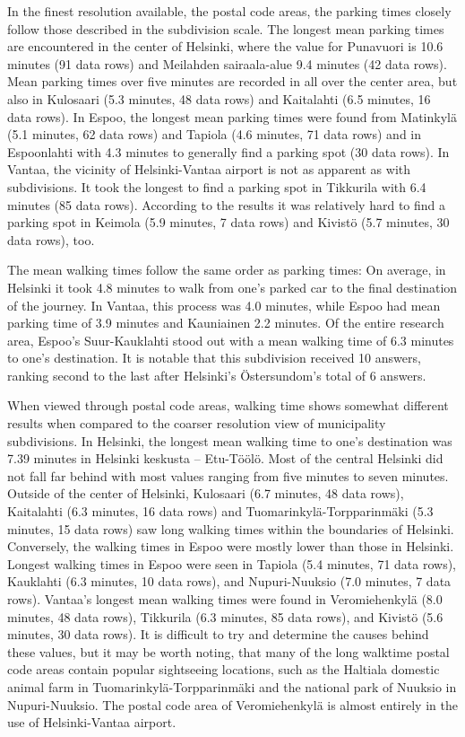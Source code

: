 In the finest resolution available, the postal code areas, the parking times closely follow those described in the subdivision scale. The longest mean parking times are encountered in the center of Helsinki, where the value for Punavuori is 10.6 minutes (91 data rows) and Meilahden sairaala-alue 9.4 minutes (42 data rows). Mean parking times over five minutes are recorded in all over the center area, but also in Kulosaari (5.3 minutes, 48 data rows) and Kaitalahti (6.5 minutes, 16 data rows). In Espoo, the longest mean parking times were found from Matinkylä (5.1 minutes, 62 data rows) and Tapiola (4.6 minutes, 71 data rows) and in Espoonlahti with 4.3 minutes to generally find a parking spot (30 data rows). In Vantaa, the vicinity of Helsinki-Vantaa airport is not as apparent as with subdivisions. It took the longest to find a parking spot in Tikkurila with 6.4 minutes (85 data rows). According to the results it was relatively hard to find a parking spot in Keimola (5.9 minutes, 7 data rows) and Kivistö (5.7 minutes, 30 data rows), too.

The mean walking times follow the same order as parking times: On average, in Helsinki it took 4.8 minutes to walk from one's parked car to the final destination of the journey. In Vantaa, this process was 4.0 minutes, while Espoo had mean parking time of 3.9 minutes and Kauniainen 2.2 minutes. Of the entire research area, Espoo's Suur-Kauklahti stood out with a mean walking time of 6.3 minutes to one's destination. It is notable that this subdivision received 10 answers, ranking second to the last after Helsinki's Östersundom's total of 6 answers.

When viewed through postal code areas, walking time shows somewhat different results when compared to the coarser resolution view of municipality subdivisions. In Helsinki, the longest mean walking time to one's destination was 7.39 minutes in Helsinki keskusta -- Etu-Töölö. Most of the central Helsinki did not fall far behind with most values ranging from five minutes to seven minutes. Outside of the center of Helsinki, Kulosaari (6.7 minutes, 48 data rows), Kaitalahti (6.3 minutes, 16 data rows) and Tuomarinkylä-Torpparinmäki (5.3 minutes, 15 data rows) saw long walking times within the boundaries of Helsinki. Conversely, the walking times in Espoo were mostly lower than those in Helsinki. Longest walking times in Espoo were seen in Tapiola (5.4 minutes, 71 data rows), Kauklahti (6.3 minutes, 10 data rows), and Nupuri-Nuuksio (7.0 minutes, 7 data rows). Vantaa's longest mean walking times were found in Veromiehenkylä (8.0 minutes, 48 data rows), Tikkurila (6.3 minutes, 85 data rows), and Kivistö (5.6 minutes, 30 data rows). It is difficult to try and determine the causes behind these values, but it may be worth noting, that many of the long walktime postal code areas contain popular sightseeing locations, such as the Haltiala domestic animal farm in Tuomarinkylä-Torpparinmäki and the national park of Nuuksio in Nupuri-Nuuksio. The postal code area of Veromiehenkylä is almost entirely in the use of Helsinki-Vantaa airport.

